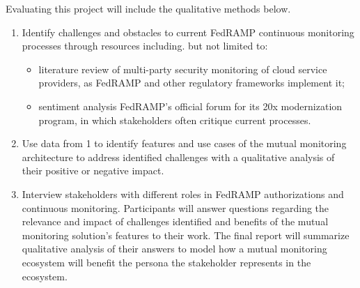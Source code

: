 Evaluating this project will include the qualitative methods below.

\begin{enumerate}
  \item Identify challenges and obstacles to current FedRAMP continuous monitoring processes through resources including. but not limited to:
  \begin{itemize}
    \item literature review of multi-party security monitoring of cloud service providers, as FedRAMP and other regulatory frameworks implement it;
    \item sentiment analysis FedRAMP's official forum for its 20x modernization program, in which stakeholders often critique current processes.
  \end{itemize}
  \item Use data from 1 to identify features and use cases of the mutual monitoring architecture to address identified challenges with a qualitative analysis of their positive or negative impact.
  \item Interview stakeholders with different roles in FedRAMP authorizations and continuous monitoring. Participants will answer questions regarding the relevance and impact of challenges identified and benefits of the mutual monitoring solution's features to their work. The final report will summarize qualitative analysis of their answers to model how a mutual monitoring ecosystem will benefit the persona the stakeholder represents in the ecosystem.
\end{enumerate}

